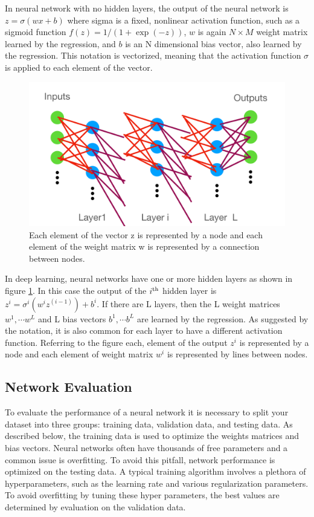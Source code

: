 \begin{refsection}
In neural network with no hidden layers, the output of the neural network is $z=\sigma(wx+b)$ where sigma is a fixed, nonlinear activation function, such as a sigmoid function $f(z)=1/(1+\exp(-z))$, $w$ is again $N \times M$ weight matrix learned by the regression, and $b$ is an N dimensional bias vector, also learned by the regression. This notation is vectorized, meaning that the activation function $\sigma$ is applied to each element of the vector.

\begin{figure}[htbp]
   \centering
   \includegraphics[width=\columnwidth]{chapter_noise_sub/etc/net_fig_cartoon}
  \caption{Each element of the vector z is represented by a node and each element of the weight matrix w is represented by a connection between nodes.}
   \label{fig:net_fig_cartoon}
\end{figure}

In deep learning, neural networks have one or more hidden layers as shown in figure \ref{fig:net_fig_cartoon}. In this case the output of the $i^{\rm th}$ hidden layer is $z^{i}=\sigma^{i}(w^{i}z^{(i-1)})+b^{i}$. If there are L layers, then the L weight matrices $w^1, \cdots w^L $ and L bias vectors $b^1, \cdots b^L $ are learned by the regression. As suggested by the notation, it is also common for each layer to have a different activation function. Referring to the figure each, element of the output $z^i$ is represented by a node and each element of weight matrix $w^i$ is represented by lines between nodes.

\subsection{Network Evaluation}
To evaluate the performance of a neural network it is necessary to split your dataset into three groups: training data, validation data, and testing data.
As described below, the training data is used to optimize the weights matrices and bias vectors. Neural networks often have thousands of free parameters and a common issue is overfitting. To avoid this pitfall, network performance is optimized on the testing data. A typical training algorithm involves a plethora of hyperparameters, such as the learning rate and various regularization parameters. To avoid overfitting by tuning these hyper parameters, the best values are determined by evaluation on the validation data.

\end{refsection}
